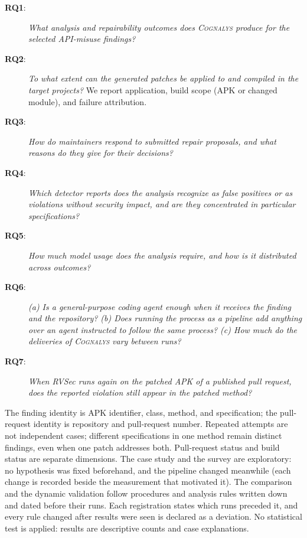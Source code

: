 \documentclass[conference]{IEEEtran}
\newcommand{\system}{\textsc{Cognalys}}
\newcommand{\researchq}[1]{\textbf{RQ#1}}
\begin{document}
\begin{description}
  \item[\researchq{1}:] \emph{What analysis and repairability outcomes does
  {\system} produce for the selected API-misuse findings?}

\item[\researchq{2}:] \emph{To what extent can the generated patches be
  applied to and compiled in the target projects?}
  We report application, build scope (APK or changed module), and failure
  attribution.

  \item[\researchq{3}:] \emph{How do maintainers respond to submitted repair
  proposals, and what reasons do they give for their decisions?}

  \item[\researchq{4}:] \emph{Which detector reports does the analysis
  recognize as false positives or as violations without security impact,
  and are they concentrated in particular specifications?}

  \item[\researchq{5}:] \emph{How much model usage does the analysis
  require, and how is it distributed across outcomes?}

\item[\researchq{6}:] \emph{(a) Is a general-purpose coding agent enough when
  it receives the finding and the repository? (b) Does running the process as a
  pipeline add anything over an agent instructed to follow the same process?
  (c) How much do the deliveries of {\system} vary between runs?}

  \item[\researchq{7}:] \emph{When RVSec runs again on the patched APK of a
  published pull request, does the reported violation still appear in the
  patched method?}
\end{description}

The finding identity is APK identifier, class, method, and specification; the
pull-request identity is repository and pull-request number. Repeated attempts are not independent
cases; different specifications in one method remain distinct findings, even
when one patch addresses both. Pull-request status and build status are separate
dimensions. The case study and the survey are exploratory: no hypothesis was
fixed beforehand, and the pipeline changed meanwhile (each change is recorded
beside the measurement that motivated it). The comparison and the dynamic
validation follow procedures and analysis rules written down and dated
before their runs. Each registration states which runs
preceded it, and every rule changed after results were seen is declared as a
deviation. No statistical test is applied: results are descriptive counts and
case explanations.
\end{document}

